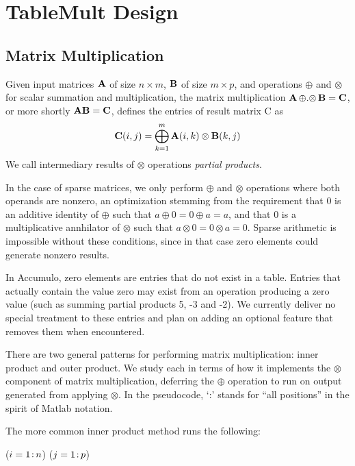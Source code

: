 
\section{TableMult Design}
\label{sDesign}


\subsection{Matrix Multiplication}
Given input matrices $\mathbf{A}$ of size $n \times m$, $\mathbf{B}$ of size $m \times p$,
and operations $\oplus$ and $\otimes$ for scalar summation and multiplication,
the matrix multiplication $\mathbf{A} \,{\oplus}.{\otimes}\, \mathbf{B} = \mathbf{C}$, or more shortly $\mathbf{A}\mathbf{B} = \mathbf{C}$,
defines the entries of result matrix C as 
\[ \mathbf{C}(i,j) = \bigoplus_{k=1}^m \mathbf{A}(i,k) \otimes \mathbf{B}(k,j) \]
We call intermediary results of $\otimes$ operations \emph{partial products}.

In the case of sparse matrices, we only perform $\oplus$ and $\otimes$ operations where both operands are nonzero,
an optimization stemming from the requirement that 0 is an additive identity of $\oplus$ such that $a \oplus 0 = 0 \oplus a = a$,
and that 0 is a multiplicative annhilator of $\otimes$ such that $a \otimes 0 = 0 \otimes a = 0$.
Sparse arithmetic is impossible without these conditions, since in that case zero elements could generate nonzero results.

In Accumulo, zero elements are entries that do not exist in a table. Entries that actually contain the value zero may exist
from an operation producing a zero value (such as summing partial products 5, -3 and -2).  
We currently deliver no special treatment to these entries and plan on adding
an optional feature that removes them when encountered.

There are two general patterns for performing matrix multiplication: inner product and outer product.
We study each in terms of how it implements the $\otimes$ component of matrix multiplication,
deferring the $\oplus$ operation to run on output generated from applying $\otimes$.
In the pseudocode, `:' stands for ``all positions'' in the spirit of Matlab notation.

The more common inner product method runs the following:
\begin{algorithm}[h]
\fore($i = 1\colon\! n$){
\fore($j = 1\colon\! p$){
}}
\end{algorithm}

